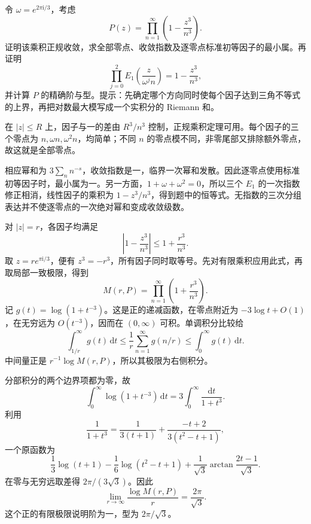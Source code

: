\begin{exercise}[三重旋转零点的精确增长]\label{b3:ex:20-draft-02}
令 \(\omega=e^{2\pi\mathrm i/3}\)，考虑
\[
 P(z)=\prod_{n=1}^\infty\left(1-\frac{z^3}{n^3}\right).
\]
证明该乘积正规收敛，求全部零点、收敛指数及逐零点标准初等因子的最小属。再证明
\[
 \prod_{j=0}^2E_1\left(\frac{z}{\omega^jn}\right)
 =1-\frac{z^3}{n^3},
\]
并计算 \(P\) 的精确阶与型。提示：先确定哪个方向同时使每个因子达到三角不等式的上界，再把对数最大模写成一个实积分的 Riemann 和。
\end{exercise}
\begin{solution}
在 \(|z|\le R\) 上，因子与一的差由 \(R^3/n^3\) 控制，正规乘积定理可用。每个因子的三个零点为 \(n,\omega n,\omega^2n\)，均简单；不同 \(n\) 的零点模不同，非零尾部又排除额外零点，故这就是全部零点。

相应幂和为 \(3\sum_n n^{-s}\)，收敛指数是一，临界一次幂和发散。因此逐零点使用标准初等因子时，最小属为一。另一方面，\(1+\omega+\omega^2=0\)，所以三个 \(E_1\) 的一次指数修正相消，线性因子的乘积为 \(1-z^3/n^3\)，得到题中的恒等式。无指数的三次分组表达并不使逐零点的一次绝对幂和变成收敛级数。

对 \(|z|=r\)，各因子均满足
\[
 \left|1-\frac{z^3}{n^3}\right|\le1+\frac{r^3}{n^3}.
\]
取 \(z=re^{\pi\mathrm i/3}\)，便有 \(z^3=-r^3\)，所有因子同时取等号。先对有限乘积应用此式，再取局部一致极限，得到
\[
 M(r,P)=\prod_{n=1}^\infty\left(1+\frac{r^3}{n^3}\right).
\]
记 \(g(t)=\log(1+t^{-3})\)。这是正的递减函数，在零点附近为 \(-3\log t+O(1)\)，在无穷远为 \(O(t^{-3})\)，因而在 \((0,\infty)\) 可积。单调积分比较给
\[
 \int_{1/r}^\infty g(t)\,\mathrm dt
 \le\frac1r\sum_{n=1}^\infty g(n/r)
 \le\int_0^\infty g(t)\,\mathrm dt.
\]
中间量正是 \(r^{-1}\log M(r,P)\)，所以其极限为右侧积分。

分部积分的两个边界项都为零，故
\[
 \int_0^\infty\log(1+t^{-3})\,\mathrm dt
 =3\int_0^\infty\frac{\mathrm dt}{1+t^3}.
\]
利用
\[
 \frac1{1+t^3}=\frac1{3(t+1)}+
 \frac{-t+2}{3(t^2-t+1)},
\]
一个原函数为
\[
 \frac13\log(t+1)-\frac16\log(t^2-t+1)
 +\frac1{\sqrt3}\arctan\frac{2t-1}{\sqrt3}.
\]
在零与无穷远取差得 \(2\pi/(3\sqrt3)\)。因此
\[
 \lim_{r\to\infty}\frac{\log M(r,P)}r=\frac{2\pi}{\sqrt3}.
\]
这个正的有限极限说明阶为一，型为 \(2\pi/\sqrt3\)。
\end{solution}


